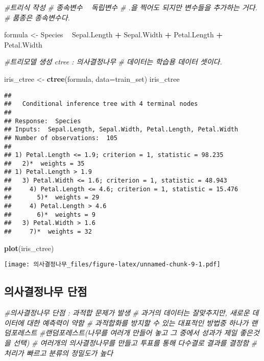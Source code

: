 \documentclass[]{article}
\newenvironment{Shaded}{\begin{snugshade}}{\end{snugshade}}
\newcommand{\KeywordTok}[1]{\textcolor[rgb]{0.13,0.29,0.53}{\textbf{#1}}}
\newcommand{\DataTypeTok}[1]{\textcolor[rgb]{0.13,0.29,0.53}{#1}}
\newcommand{\StringTok}[1]{\textcolor[rgb]{0.31,0.60,0.02}{#1}}
\newcommand{\CommentTok}[1]{\textcolor[rgb]{0.56,0.35,0.01}{\textit{#1}}}
\newcommand{\OperatorTok}[1]{\textcolor[rgb]{0.81,0.36,0.00}{\textbf{#1}}}
\newcommand{\NormalTok}[1]{#1}
\begin{document}
\begin{Shaded}
\begin{Highlighting}[]
\CommentTok{#트리식 작성}
\CommentTok{# 종속변수 ~ 독립변수}
\CommentTok{# .을 찍어도 되지만 변수들을 추가하는 거다.}
\CommentTok{# 품종은 종속변수다.}

\NormalTok{formula <-}\StringTok{ }\NormalTok{Species }\OperatorTok{~}\StringTok{ }\NormalTok{Sepal.Length }\OperatorTok{+}\StringTok{ }\NormalTok{Sepal.Width }\OperatorTok{+}\StringTok{ }\NormalTok{Petal.Length }\OperatorTok{+}\StringTok{ }\NormalTok{Petal.Width}

\CommentTok{#트리모델 생성 ctree : 의사결정나무}
\CommentTok{# 데이터는 학습용 데이터 셋이다.}

\NormalTok{iris_ctree <-}\StringTok{ }\KeywordTok{ctree}\NormalTok{(formula, }\DataTypeTok{data=}\NormalTok{train_set)}
\NormalTok{iris_ctree}
\end{Highlighting}
\end{Shaded}

\begin{verbatim}
## 
##   Conditional inference tree with 4 terminal nodes
## 
## Response:  Species 
## Inputs:  Sepal.Length, Sepal.Width, Petal.Length, Petal.Width 
## Number of observations:  105 
## 
## 1) Petal.Length <= 1.9; criterion = 1, statistic = 98.235
##   2)*  weights = 35 
## 1) Petal.Length > 1.9
##   3) Petal.Width <= 1.6; criterion = 1, statistic = 48.943
##     4) Petal.Length <= 4.6; criterion = 1, statistic = 15.476
##       5)*  weights = 29 
##     4) Petal.Length > 4.6
##       6)*  weights = 9 
##   3) Petal.Width > 1.6
##     7)*  weights = 32
\end{verbatim}

\begin{Shaded}
\begin{Highlighting}[]
\KeywordTok{plot}\NormalTok{(iris_ctree)}
\end{Highlighting}
\end{Shaded}

\texttt{[image: 의사결정나무\_files/figure-latex/unnamed-chunk-9-1.pdf]}

\subsection{의사결정나무 단점}\label{-}

\begin{Shaded}
\begin{Highlighting}[]
\CommentTok{#의사결정나무 단점 : 과적합 문제가 발생}
\CommentTok{# 과거의 데이터는 잘맞추지만, 새로운 데이터에 대한 예측력이 약함}
\CommentTok{# 과적합화를 방지할 수 있는 대표적인 방법중 하나가 랜덤포레스트}
\CommentTok{#랜덤포레스트(나무를 여러개 만들어 놓고 그 중에서 성과가 제일 좋은것을 선택)}
\CommentTok{# 여러개의 의사결정나무를 만들고 투표를 통해 다수결로 결과를 결정함}
\CommentTok{# 처리가 빠르고 분류의 정밀도가 높다}
\end{Highlighting}
\end{Shaded}
\end{document}
